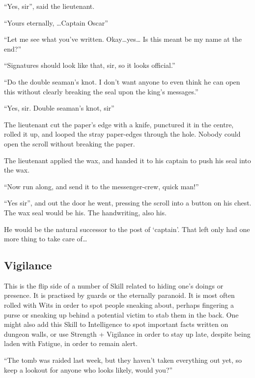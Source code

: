 \begin{multicols}{2}
\begin{exampletext}
  ``Yes, sir'', said the lieutenant.

  ``Yours eternally, \ldots Captain Oscar''

  ``Let me see what you've written.
  Okay\ldots yes\ldots
  Is this meant be my name at the end?''

  ``Signatures should look like that, sir, so it looks official.''

  ``Do the double seaman's knot.
  I don't want anyone to even think he can open this without clearly breaking the seal upon the king's messages.''

  ``Yes, sir.
  Double seaman's knot, sir''

  The lieutenant cut the paper's edge with a knife, punctured it in the centre, rolled it up, and looped the stray paper-edges through the hole.
  Nobody could open the scroll without breaking the paper.

  The lieutenant applied the wax, and handed it to his captain to push his seal into the wax.

  ``Now run along, and send it to the messenger-crew, quick man!''

  ``Yes sir'', and out the door he went, pressing the scroll into a button on his chest.
  The wax seal would be his.
  The handwriting, also his.

  He would be the natural successor to the post of `captain'.
  That left only had one more thing to take care of\ldots
  
\end{exampletext}

\subsection{Vigilance}

This is the flip side of a number of Skill related to hiding one's doings or presence.
It is practised by guards or the eternally paranoid.
It is most often rolled with Wits in order to spot people sneaking about, perhaps fingering a purse or sneaking up behind a potential victim to stab them in the back.
One might also add this Skill to Intelligence to spot important facts written on dungeon walls, or use Strength + Vigilance in order to stay up late, despite being laden with Fatigue, in order to remain alert.

\begin{exampletext}
  ``The tomb was raided last week, but they haven't taken everything out yet, so keep a lookout for anyone who looks likely, would you?''


\end{exampletext}
\end{multicols}
